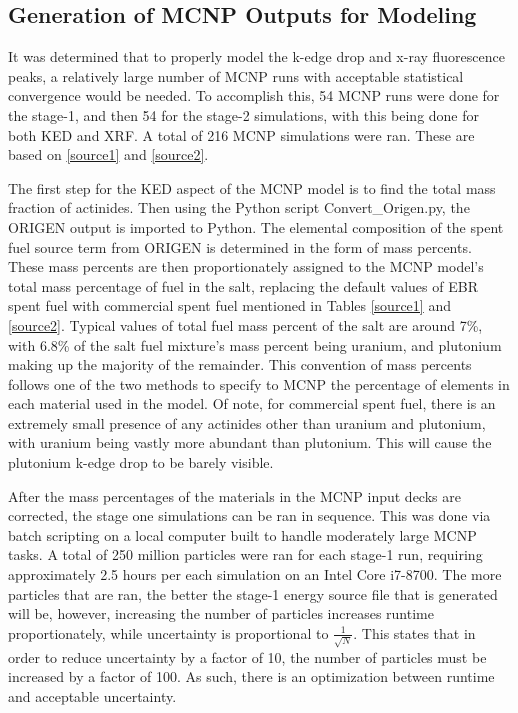 \subsection{Generation of MCNP Outputs for Modeling}

It was determined that to properly model the k-edge drop and x-ray fluorescence peaks, a relatively large number of MCNP runs with acceptable statistical convergence would be needed. To accomplish this, 54 MCNP runs were done for the stage-1, and then 54 for the stage-2 simulations, with this being done for both KED and XRF. A total of 216 MCNP simulations were ran. These are based on \ref{source1} and \ref{source2}. 

The first step for the KED aspect of the MCNP model is to find the total mass fraction of actinides. Then using the Python script Convert\_Origen.py, the ORIGEN output is imported to Python. The elemental composition of the spent fuel source term from ORIGEN is determined in the form of mass percents. These mass percents are then proportionately assigned to the MCNP model's total mass percentage of fuel in the salt, replacing the default values of EBR spent fuel with commercial spent fuel mentioned in Tables \ref{source1} and \ref{source2}. Typical values of total fuel mass percent of the salt are around 7\%, with 6.8\% of the salt fuel mixture's mass percent being uranium, and plutonium making up the majority of the remainder. This convention of mass percents follows one of the two methods to specify to MCNP the percentage of elements in each material used in the model. Of note, for commercial spent fuel, there is an extremely small presence of any actinides other than uranium and plutonium, with uranium being vastly more abundant than plutonium. This will cause the plutonium k-edge drop to be barely visible.  %

After the mass percentages of the materials in the MCNP input decks are corrected, the stage one simulations can be ran in sequence. This was done via batch scripting on a local computer built to handle moderately large MCNP tasks. A total of 250 million particles were ran for each stage-1 run, requiring approximately 2.5 hours per each simulation on an Intel Core i7-8700. The more particles that are ran, the better the stage-1 energy source file that is generated will be, however, increasing the number of particles increases runtime proportionately, while uncertainty is proportional to $\frac{1}{\sqrt{N}}$. This states that in order to reduce uncertainty by a factor of 10, the number of particles must be increased by a factor of 100. As such, there is an optimization between runtime and acceptable uncertainty. 


